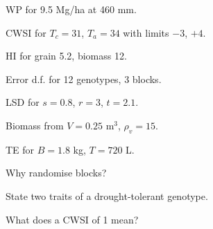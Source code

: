 \begin{exlist}
\item WP for 9.5 Mg/ha at 460 mm.
\item CWSI for $T_c=31$, $T_a=34$ with limits $-3$, $+4$.
\item HI for grain 5.2, biomass 12.
\item Error d.f. for 12 genotypes, 3 blocks.
\item LSD for $s=0.8$, $r=3$, $t=2.1$.
\item Biomass from $V=0.25$ m$^3$, $\rho_v=15$.
\item TE for $B=1.8$ kg, $T=720$ L.
\item Why randomise blocks?
\item State two traits of a drought-tolerant genotype.
\item What does a CWSI of 1 mean?
\end{exlist}
